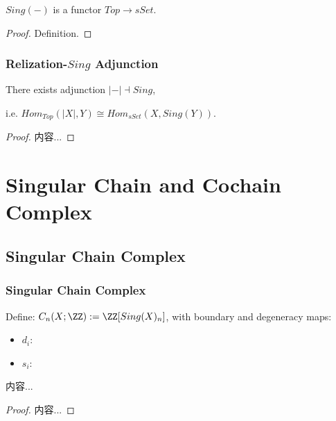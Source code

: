 \documentclass[Total.tex]{subfiles}
\begin{document}
			\begin{corollary}
				$Sing(-)$ is a functor $Top\rightarrow sSet$.
			\end{corollary}
			\begin{proof}
				Definition.
			\end{proof}
			
			\subsubsection{Relization-$Sing$ Adjunction}
				\begin{theorem}
					There exists adjunction  $|-|\dashv Sing$,
					\begin{center}
					\end{center}
					
					i.e. $Hom_{Top}(|X|,Y)\cong Hom_{sSet}(X,Sing(Y))$.
				\end{theorem}
				\begin{proof}
					内容...
				\end{proof}
			\section{Singular Chain and Cochain Complex}
			\subsection{Singular Chain Complex}
				\subsubsection{Singular Chain Complex}
				\begin{Def}
					Define: $C_n(X;\ZZ):=\ZZ[Sing(X)_n]$, with boundary and degeneracy maps:
					\begin{itemize}
						\item $d_i:$
						\item $s_i:$
					\end{itemize}
				\end{Def}
				
				\begin{proposition}
					内容...
				\end{proposition}
				
				\begin{proof}
					内容...
				\end{proof}
				
\end{document}
